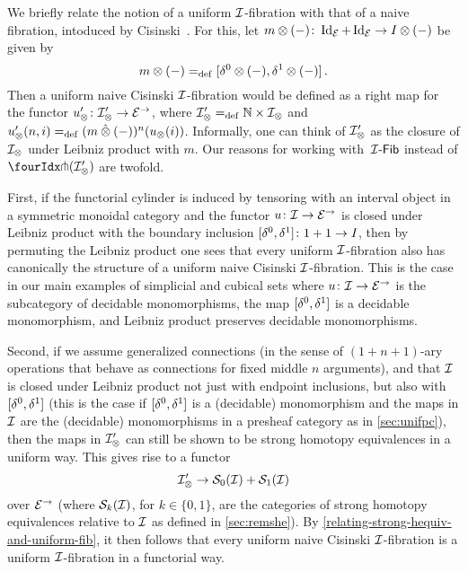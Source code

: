 \documentclass[reqno,10pt,a4paper,oneside,draft]{amsart}
\begin{document}
\begin{remark} \label{cisinski-remark}
We briefly relate the notion of a uniform $\cal{I}$-fibration with that of a naive fibration, intoduced by Cisinski~\cite{cisinski-asterisque}.
For this, let $m \otimes (-)  \co \Id_\catE + \Id_\catE \to \interval \otimes (-)$ be given by
\[
  m \otimes (-) \defeq [\lcyl \otimes (-), \rcyl \otimes (-)] \, .
\]
Then a uniform naive Cisinski $\cal{I}$-fibration would be defined as a right map for the functor $u_\otimes' \co \cal{I}_\otimes' \to \catE^\to$, where $\cal{I}_\otimes' \defeq \mathbb{N} \times \cal{I}_\otimes$ and $u_\otimes'(n, i) \defeq (m \hatotimes (-))^n(u_\otimes(i))$.
Informally, one can think of
$\cal{I}_\otimes'$ as the closure of $\cal{I}_\otimes$ under Leibniz product with $m$.
Our reasons for working with~$\Fib{\cal{I}}$ instead of $\liftr{(\cal{I}_\otimes')}$ are twofold.

First, if the functorial cylinder is induced by tensoring with an interval object in a symmetric monoidal category and the functor $u \co \cal{I} \to \catE^\to$ is closed under Leibniz product with the boundary inclusion $[\lcyl, \rcyl] \co 1 + 1 \to \interval$, then by permuting the Leibniz product one sees that every uniform $\cal{I}$-fibration also has canonically the structure of a uniform naive Cisinski $\cal{I}$-fibration.
This is the case in our main examples of simplicial and cubical sets where $u \co \cal{I} \to \catE^\to$ is the subcategory of decidable monomorphisms, the map $[\lcyl, \rcyl]$ is a decidable monomorphism, and Leibniz product preserves decidable monomorphisms.

Second, if we assume generalized connections (in the sense of $(1+n+1)$-ary operations that behave as connections for fixed middle $n$ arguments), and that $\cal{I}$ is closed under Leibniz product not just with endpoint inclusions, but also with $[\lcyl, \rcyl]$ (this is the case if $[\lcyl, \rcyl]$ is a (decidable) monomorphism and the maps in $\cal{I}$ are the (decidable) monomorphisms in a presheaf category as in \cref{sec:unifpc}), then the maps in $\cal{I}_\otimes'$ can still be shown to be strong homotopy equivalences in a uniform way.
This gives rise to a functor
\[
  \cal{I}_\otimes' \to \cal{S}_0(\cal{I}) + \cal{S}_1(\cal{I})
\]
over $\catE^\to$ (where $\cal{S}_k(\cal{I})$, for $k \in \{0,1\}$, are the categories of strong homotopy equivalences relative to $\cal{I}$ as defined in \cref{sec:remshe}).
By \cref{relating-strong-hequiv-and-uniform-fib}, it then follows that every uniform naive Cisinski $\cal{I}$-fibration is a uniform $\cal{I}$-fibration in a functorial way.
\end{remark}
\end{document}
